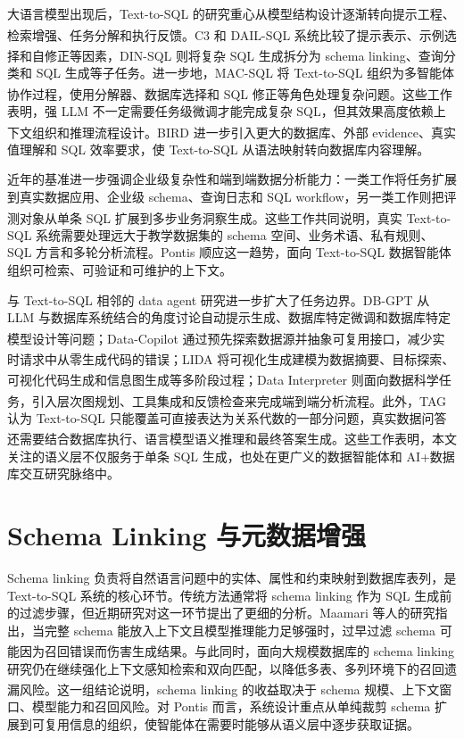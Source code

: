 \documentclass[
    bachelor,
    pdflinks,
]{xjtuthesis}
\newcommand{\upcite}[1]{\textsuperscript{\cite{#1}}}
\begin{document}
大语言模型出现后，Text-to-SQL 的研究重心从模型结构设计逐渐转向提示工程、检索增强、任务分解和执行反馈。C3\upcite{gao2024c3} 和 DAIL-SQL\upcite{gao2023dailsql} 系统比较了提示表示、示例选择和自修正等因素，DIN-SQL\upcite{pourreza2024dinsql} 则将复杂 SQL 生成拆分为 schema linking、查询分类和 SQL 生成等子任务。进一步地，MAC-SQL 将 Text-to-SQL 组织为多智能体协作过程，使用分解器、数据库选择和 SQL 修正等角色处理复杂问题\upcite{wang2025macsql}。这些工作表明，强 LLM 不一定需要任务级微调才能完成复杂 SQL，但其效果高度依赖上下文组织和推理流程设计。BIRD\upcite{li2023bird} 进一步引入更大的数据库、外部 evidence、真实值理解和 SQL 效率要求，使 Text-to-SQL 从语法映射转向数据库内容理解。

近年的基准进一步强调企业级复杂性和端到端数据分析能力：一类工作将任务扩展到真实数据应用、企业级 schema、查询日志和 SQL workflow，另一类工作则把评测对象从单条 SQL 扩展到多步业务洞察生成\upcite{lei2025spider2,chen2025beaver,sahu2025insightbench}。这些工作共同说明，真实 Text-to-SQL 系统需要处理远大于教学数据集的 schema 空间、业务术语、私有规则、SQL 方言和多轮分析流程。Pontis 顺应这一趋势，面向 Text-to-SQL 数据智能体组织可检索、可验证和可维护的上下文。

与 Text-to-SQL 相邻的 data agent 研究进一步扩大了任务边界。DB-GPT 从 LLM 与数据库系统结合的角度讨论自动提示生成、数据库特定微调和数据库特定模型设计等问题\upcite{zhou2024dbgpt}；Data-Copilot 通过预先探索数据源并抽象可复用接口，减少实时请求中从零生成代码的错误\upcite{zhang2023dataCopilot}；LIDA 将可视化生成建模为数据摘要、目标探索、可视化代码生成和信息图生成等多阶段过程\upcite{dibia2023lida}；Data Interpreter 则面向数据科学任务，引入层次图规划、工具集成和反馈检查来完成端到端分析流程\upcite{hong2024dataInterpreter}。此外，TAG 认为 Text-to-SQL 只能覆盖可直接表达为关系代数的一部分问题，真实数据问答还需要结合数据库执行、语言模型语义推理和最终答案生成\upcite{biswal2025tag}。这些工作表明，本文关注的语义层不仅服务于单条 SQL 生成，也处在更广义的数据智能体和 AI+数据库交互研究脉络中。

\section{Schema Linking 与元数据增强}

Schema linking 负责将自然语言问题中的实体、属性和约束映射到数据库表列，是 Text-to-SQL 系统的核心环节。传统方法通常将 schema linking 作为 SQL 生成前的过滤步骤，但近期研究对这一环节提出了更细的分析。Maamari 等人的研究指出，当完整 schema 能放入上下文且模型推理能力足够强时，过早过滤 schema 可能因为召回错误而伤害生成结果\upcite{maamari2024deathSchemaLinking}。与此同时，面向大规模数据库的 schema linking 研究仍在继续强化上下文感知检索和双向匹配，以降低多表、多列环境下的召回遗漏风险\upcite{nahid2025schemaLinking,eben2025rasl}。这一组结论说明，schema linking 的收益取决于 schema 规模、上下文窗口、模型能力和召回风险。对 Pontis 而言，系统设计重点从单纯裁剪 schema 扩展到可复用信息的组织，使智能体在需要时能够从语义层中逐步获取证据。
\end{document}
